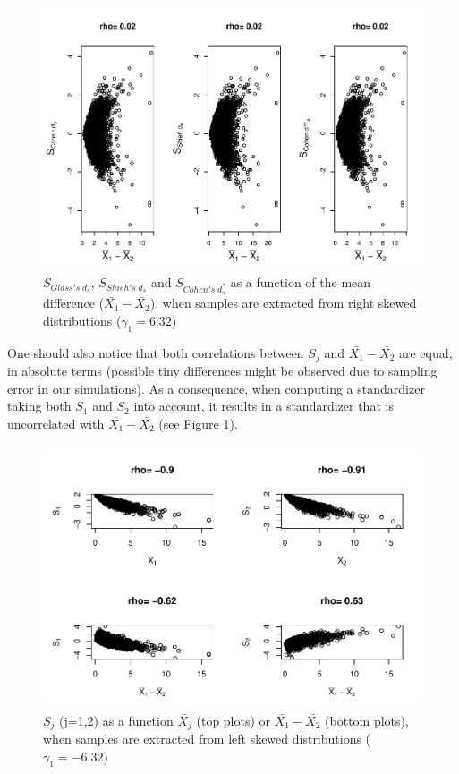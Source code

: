 \documentclass[
  english,
  man]{apa6}
\begin{document}
\begin{figure}
\centering
\includegraphics{Correlation_files/figure-latex/pltStdzrHombalRskew-1.pdf}
\caption{\label{fig:pltStdzrHombalRskew}\(S_{Glass's \; d_s}\), \(S_{Shieh's \; d_s}\) and \(S_{Cohen's \; d^*_s}\) as a function of the mean difference (\(\bar{X_1}-\bar{X_2}\)), when samples are extracted from right skewed distributions (\(\gamma_1 = 6.32\))}
\end{figure}

One should also notice that both correlations between \(S_j\) and \(\bar{X_1}-\bar{X_2}\) are equal, in absolute terms (possible tiny differences might be observed due to sampling error in our simulations). As a consequence, when computing a standardizer taking both \(S_1\) and \(S_2\) into account, it results in a standardizer that is uncorrelated with \(\bar{X_1}-\bar{X_2}\) (see Figure \ref{fig:pltStdzrHombalRskew}).

\begin{figure}
\centering
\includegraphics{Correlation_files/figure-latex/pltSDHombalLskew-1.pdf}
\caption{\label{fig:pltSDHombalLskew}\(S_j\) (j=1,2) as a function \(\bar{X_j}\) (top plots) or \(\bar{X_1}-\bar{X_2}\) (bottom plots), when samples are extracted from left skewed distributions (\(\gamma_1 = -6.32\))}
\end{figure}
\end{document}
